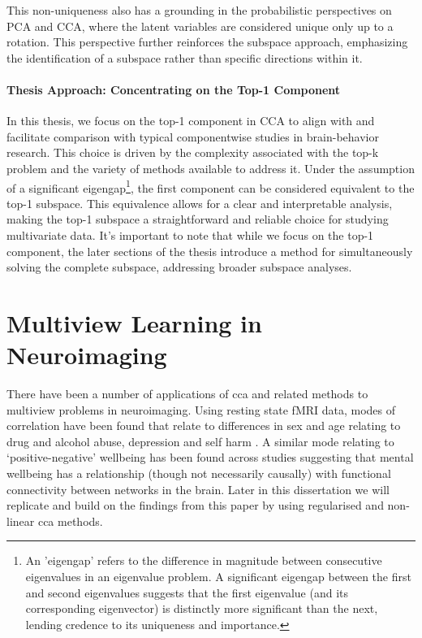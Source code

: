 This non-uniqueness also has a grounding in the probabilistic perspectives on PCA and CCA, where the latent variables are considered unique only up to a rotation.
This perspective further reinforces the subspace approach, emphasizing the identification of a subspace rather than specific directions within it.

\paragraph{Thesis Approach: Concentrating on the Top-1 Component}

In this thesis, we focus on the top-1 component in CCA to align with and facilitate comparison with typical componentwise studies in brain-behavior research. This choice is driven by the complexity associated with the top-k problem and the variety of methods available to address it. Under the assumption of a significant eigengap\footnote{An 'eigengap' refers to the difference in magnitude between consecutive eigenvalues in an eigenvalue problem. A significant eigengap between the first and second eigenvalues suggests that the first eigenvalue (and its corresponding eigenvector) is distinctly more significant than the next, lending credence to its uniqueness and importance.}, the first component can be considered equivalent to the top-1 subspace. This equivalence allows for a clear and interpretable analysis, making the top-1 subspace a straightforward and reliable choice for studying multivariate data. It's important to note that while we focus on the top-1 component, the later sections of the thesis introduce a method for simultaneously solving the complete subspace, addressing broader subspace analyses.


\section{Multiview Learning in Neuroimaging}

There have been a number of applications of \acrshort{cca} and related methods to multiview problems in neuroimaging.
Using resting state fMRI data, modes of correlation have been found that relate to differences in sex and age relating to drug and alcohol abuse, depression and self harm \citep{mihalik2019brain}.
A similar mode relating to `positive-negative' wellbeing has been found across studies \citep{smith2015positive}suggesting that mental wellbeing has a relationship (though not necessarily causally) with functional connectivity between networks in the brain.
Later in this dissertation we will replicate and build on the findings from this paper by using regularised and non-linear \acrshort{cca} methods.

